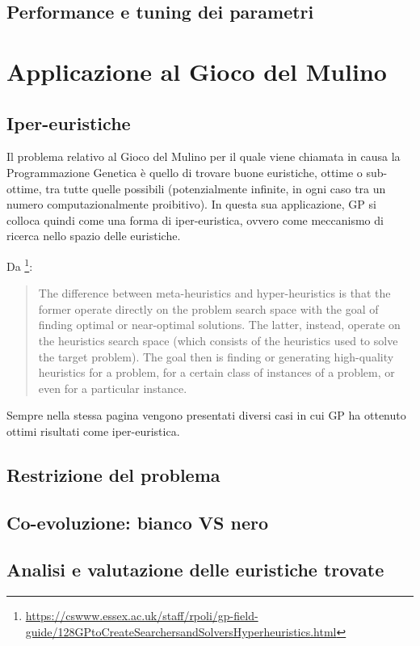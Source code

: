 \documentclass{../llncs}
\begin{document}
\subsection{Performance e tuning dei parametri}

\section{Applicazione al Gioco del Mulino}
\subsection{Iper-euristiche}
Il problema relativo al Gioco del Mulino per il quale viene chiamata in causa la Programmazione Genetica è quello di trovare buone euristiche, ottime o sub-ottime, tra tutte quelle possibili (potenzialmente infinite, in ogni caso tra un numero computazionalmente proibitivo). In questa sua applicazione, GP si colloca quindi come una forma di iper-euristica, ovvero come meccanismo di ricerca nello spazio delle euristiche.

Da \footnote{\url{https://cswww.essex.ac.uk/staff/rpoli/gp-field-guide/128GPtoCreateSearchersandSolversHyperheuristics.html}}:
\begin{quote}
The difference between meta-heuristics and hyper-heuristics is that the former operate directly on the problem search space with the goal of finding optimal or near-optimal solutions. The latter, instead, operate on the heuristics search space (which consists of the heuristics used to solve the target problem). The goal then is finding or generating high-quality heuristics for a problem, for a certain class of instances of a problem, or even for a particular instance.
\end{quote}
Sempre nella stessa pagina vengono presentati diversi casi in cui GP ha ottenuto ottimi risultati come iper-euristica.

\subsection{Restrizione del problema}
\subsection{Co-evoluzione: bianco VS nero}
\subsection{Analisi e valutazione delle euristiche trovate}
\end{document}
